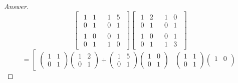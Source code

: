 \documentclass{amsbook}
\theoremstyle{definition}
\theoremstyle{remark}
\numberwithin{section}{chapter}
\numberwithin{equation}{chapter}
\begin{document}
\begin{proof}[Answer]
\[
\left[
\begin{array}{c|c}
\begin{matrix}
1&1\\
0&1\end{matrix} & \begin{matrix}
1&5\\
0&1\end{matrix}\\\hline
\begin{matrix}
1&0\\
0&1\end{matrix}&\begin{matrix}
0&1\\
1&0\end{matrix}
\end{array}
\right]
\left[
\begin{array}{c|c}
\begin{matrix}
1&2\\
0&1\end{matrix} & \begin{matrix}
1&0\\
0&1\end{matrix}\\\hline
\begin{matrix}
1&0\\
0&1\end{matrix}&\begin{matrix}
0&1\\
1&3\end{matrix}
\end{array}
\right]
\]
\[
=\left[
\begin{array}{c|c}
\begin{pmatrix}
1&1\\
0&1\end{pmatrix}\begin{pmatrix}
1&2\\
0&1\end{pmatrix}+\begin{pmatrix}
1&5\\
0&1\end{pmatrix}\begin{pmatrix}
1&0\\
0&1\end{pmatrix} & \begin{pmatrix}
1&1\\
0&1\end{pmatrix}\begin{pmatrix}
1&0\\

\end{pmatrix}
\end{array}\]
\end{proof}
\end{document}
